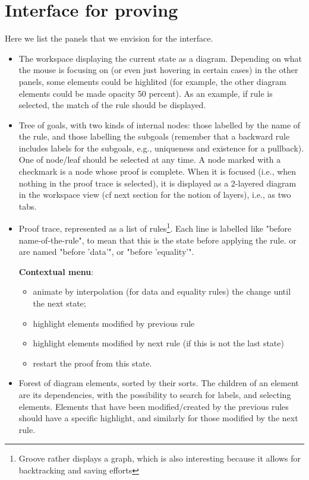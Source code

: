 \documentclass{article}
\begin{document}
\section{Interface for proving}
Here we list the panels that we envision for the interface.
\begin{itemize}
    \item The workspace displaying the current state as a diagram. 
    Depending on what the mouse is focusing on (or even just hovering in certain cases) in the other panels, some elements could be highlited (for example, the other diagram elements could be made opacity 50 percent). As an example, if rule is selected, the match of the rule should be displayed.
    \item Tree of goals, with two kinds of internal nodes: those labelled by the name of the  rule, and those labelling the subgoals (remember that a backward rule includes labels for the subgoals, e.g., uniqueness and existence for a pullback). One of node/leaf should be selected at any time.
    A node marked with a checkmark is a node whose proof is complete.
    When it is focused (i.e., when nothing in the proof trace is selected), it is displayed as a 2-layered diagram in the workspace view (cf next section for the notion of layers), i.e., as two tabs.


    \item Proof trace, represented as a list of rules\footnote{Groove rather displays a graph, which is also interesting because it allows for backtracking and saving efforts}. Each line is labelled like "before name-of-the-rule", to mean that this is the state before applying the rule.
     or  are named "before 'data'", 
    or "before 'equality'". 

    \textbf{Contextual menu}: 
    \begin{itemize}
        \item animate by interpolation (for data and equality rules) the change until the next state;
        \item highlight elements modified by previous rule
        \item highlight elements modified by next rule (if this is not the last state)
        \item restart the proof from this state.
    \end{itemize}
    \item Forest of diagram elements, sorted by their sorts. The children of an element are its dependencies, with the possibility to search for labels, and selecting elements.
  Elements that have been modified/created by the previous rules should have a specific highlight, and similarly for those modified by the next rule.
    

\end{itemize}
\end{document}
